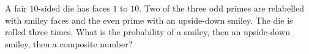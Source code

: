 A fair $10$-sided die has faces $1$ to $10$. Two of the three odd primes are relabelled with smiley faces and the even prime with an upside-down smiley. The die is rolled three times. What is the probability of a smiley, then an upside-down smiley, then a composite number?
